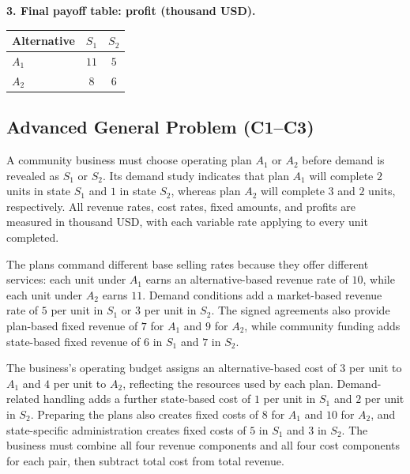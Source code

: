 \noindent\begin{minipage}{\linewidth}
\textbf{3. Final payoff table: profit (thousand USD).}
\begin{center}
\begin{tabular}{@{}lcc@{}}
\toprule
Alternative & \(S_1\) & \(S_2\) \\
\midrule
\(A_1\) & \(11\) & \(5\) \\
\(A_2\) & \(8\) & \(6\) \\
\bottomrule
\end{tabular}
\end{center}
\end{minipage}




	\subsection{Advanced General Problem (C1--C3)}
	\label{sec:problem2-advanced-general-c1-c3}

	A community business must choose operating plan \(A_1\) or \(A_2\) before demand is revealed as \(S_1\) or \(S_2\). Its demand study indicates that plan \(A_1\) will complete \(2\) units in state \(S_1\) and \(1\) in state \(S_2\), whereas plan \(A_2\) will complete \(3\) and \(2\) units, respectively. All revenue rates, cost rates, fixed amounts, and profits are measured in thousand USD, with each variable rate applying to every unit completed.

	The plans command different base selling rates because they offer different services: each unit under \(A_1\) earns an alternative-based revenue rate of \(10\), while each unit under \(A_2\) earns \(11\). Demand conditions add a market-based revenue rate of \(5\) per unit in \(S_1\) or \(3\) per unit in \(S_2\). The signed agreements also provide plan-based fixed revenue of \(7\) for \(A_1\) and \(9\) for \(A_2\), while community funding adds state-based fixed revenue of \(6\) in \(S_1\) and \(7\) in \(S_2\).

	The business's operating budget assigns an alternative-based cost of \(3\) per unit to \(A_1\) and \(4\) per unit to \(A_2\), reflecting the resources used by each plan. Demand-related handling adds a further state-based cost of \(1\) per unit in \(S_1\) and \(2\) per unit in \(S_2\). Preparing the plans also creates fixed costs of \(8\) for \(A_1\) and \(10\) for \(A_2\), and state-specific administration creates fixed costs of \(5\) in \(S_1\) and \(3\) in \(S_2\). The business must combine all four revenue components and all four cost components for each pair, then subtract total cost from total revenue.

